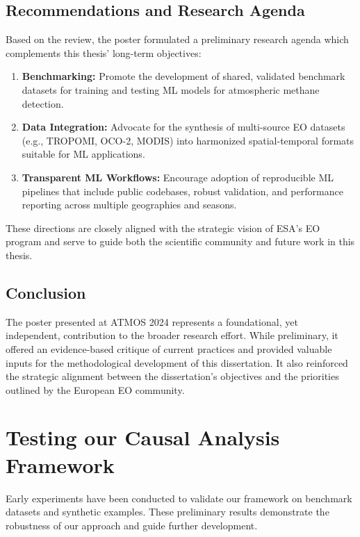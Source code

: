 \subsection{Recommendations and Research Agenda}

Based on the review, the poster formulated a preliminary research agenda which complements this thesis’ long-term objectives:

\begin{enumerate}
    \item \textbf{Benchmarking:} Promote the development of shared, validated benchmark datasets for training and testing ML models for atmospheric methane detection.
    \item \textbf{Data Integration:} Advocate for the synthesis of multi-source EO datasets (e.g., TROPOMI, OCO-2, MODIS) into harmonized spatial-temporal formats suitable for ML applications.
    \item \textbf{Transparent ML Workflows:} Encourage adoption of reproducible ML pipelines that include public codebases, robust validation, and performance reporting across multiple geographies and seasons.
\end{enumerate}

These directions are closely aligned with the strategic vision of ESA’s EO program and serve to guide both the scientific community and future work in this thesis.

\subsection{Conclusion}

The poster presented at ATMOS 2024 represents a foundational, yet independent, contribution to the broader research effort. While preliminary, it offered an evidence-based critique of current practices and provided valuable inputs for the methodological development of this dissertation. It also reinforced the strategic alignment between the dissertation's objectives and the priorities outlined by the European EO community.



\section{Testing our Causal Analysis Framework}

Early experiments have been conducted to validate our framework on benchmark datasets and synthetic examples. These preliminary results demonstrate the robustness of our approach and guide further development.

